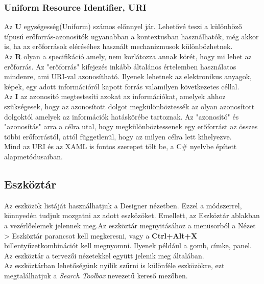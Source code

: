 \documentclass[tocnopagenum]{thesis-ekf}
\theoremstyle{definition}
\theoremstyle{remark}
\begin{document}
\subsubsection{Uniform Resource Identifier, URI}
Az \textbf{U} egységesség(Uniform) számos előnnyel jár. Lehetővé teszi a különböző típusú
erőforrás-azonosítók ugyanabban a kontextusban használhatók, még akkor is, ha az erőforrások eléréséhez használt mechanizmusok különbözhetnek.
\\
Az \textbf{R} olyan a specifikáció amely, nem korlátozza annak körét, hogy mi lehet az erőforrás. Az "erőforrás" kifejezés inkább általános értelemben használatos mindenre, ami URI-val azonosítható. Ilyenek lehetnek az elektronikus anyagok, képek, egy adott információról kapott forrás valamilyen következetes céllal.
\\
Az \textbf{I} az azonosító megtestesíti azokat az információkat, amelyek ahhoz szükségesek, hogy az azonosított dolgot megkülönböztessék az olyan azonosított dolgoktól amelyek az információk hatáskörébe tartoznak.\cite{uri}
Az "azonosító" és "azonosítás" arra a célra utal, hogy megkülönböztessenek egy erőforrást az összes többi erőforrástól, attól függetlenül, hogy az milyen célra lett kihelyezve.  
\\
Mind az URI és az XAML is fontos szerepet tölt be, a C\# nyelvbe épített alapmetódusaiban.
	\subsection{Eszköztár}
	\label{EszkozLista}
	Az eszközök listáját használhatjuk a Designer nézetben. Ezzel a módszerrel, könnyedén tudjuk mozgatni az adott eszközöket. Emellett, az Eszköztár ablakban a vezérlőelemek jelennek meg.Az eszköztár megnyitásához a menüsorból a Nézet > Eszköztár parancsot kell megkeresni, vagy a \textbf{Ctrl+Alt+X} billentyűzetkombinációt kell megnyomni. Ilyenek például a gomb, címke, panel. Az eszköztár a tervezői nézetekkel együtt jelenik meg általában. 
	\\
	Az eszköztárban lehetőségünk nyílik szűrni is különféle eszközökre, ezt megtalálhatjuk a \textit{Search Toolbox} nevezetű kereső mezőben.
\end{document}
